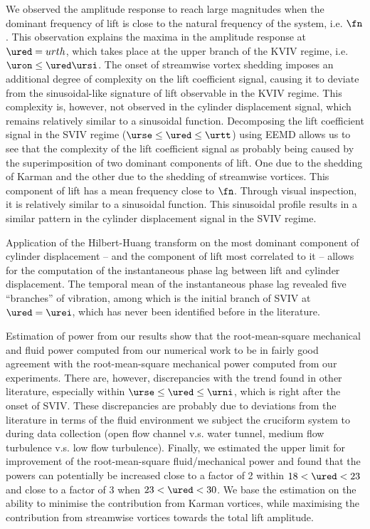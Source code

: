 \documentclass[a4paper,fleqn]{cas-sc}
\begin{document}
We observed the amplitude response to reach large magnitudes when the dominant frequency of lift is close to the natural frequency of the system, i.e. $\fn$. This observation explains the maxima in the amplitude response at $\ured = urth$, which takes place at the upper branch of the KVIV regime, i.e. $\uron \leq \ured \ursi$. The onset of streamwise vortex shedding imposes an additional degree of complexity on the lift coefficient signal, causing it to deviate from the sinusoidal-like signature of lift observable in the KVIV regime. This complexity is, however, not observed in the cylinder displacement signal, which remains relatively similar to a sinusoidal function. Decomposing the lift coefficient signal in the SVIV regime ($\urse \leq \ured \leq \urtt$) using EEMD allows us to see that the complexity of the lift coefficient signal as probably being caused by the superimposition of two dominant components of lift. One due to the shedding of Karman and the other due to the shedding of streamwise vortices. This component of lift has a mean frequency close to $\fn$. Through visual inspection, it is relatively similar to a sinusoidal function. This sinusoidal profile results in a similar pattern in the cylinder displacement signal in the SVIV regime.

Application of the Hilbert-Huang transform on the most dominant component of cylinder displacement -- and the component of lift most correlated to it -- allows for the computation of the instantaneous phase lag between lift and cylinder displacement. The temporal mean of the instantaneous phase lag revealed five ``branches'' of vibration, among which is the initial branch of SVIV at $\ured = \urei$, which has never been identified before in the literature.

Estimation of power from our results show that the root-mean-square mechanical and fluid power computed from our numerical work to be in fairly good agreement with the root-mean-square mechanical power computed from our experiments. There are, however, discrepancies with the trend found in other literature, especially within $\urse \leq \ured \leq \urni$, which is right after the onset of SVIV. These discrepancies are probably due to deviations from the literature in terms of the fluid environment we subject the cruciform system to during data collection (open flow channel v.s. water tunnel, medium flow turbulence v.s. low flow turbulence). Finally, we estimated the upper limit for improvement of the root-mean-square fluid/mechanical power and found that the \rms{} powers can potentially be increased close to a factor of 2 within $18 < \ured < 23$ and close to a factor of 3 when $23 < \ured < 30$. We base the estimation on the ability to minimise the contribution from Karman vortices, while maximising the contribution from streamwise vortices towards the total \rms{} lift amplitude.
\end{document}
